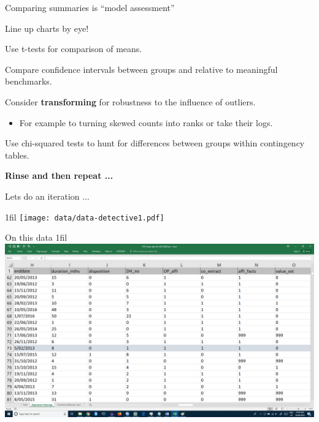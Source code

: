\documentclass{beamer}
\makeatletter
\newcommand*{\centerfloat}{%
	\parindent \z@
	\leftskip \z@ \@plus 1fil \@minus \textwidth
	\rightskip\leftskip
	\parfillskip \z@skip}
\theoremstyle{example}
\newenvironment{bigitemize}{\itemize\addtolength{\itemsep}{1em}}{\enditemize}
\makeatother
\begin{document}
	
	
	
	
	\begin{frame}{Comparing summaries is ``model assessment''}
		\begin{bigitemize}
			\item<+-> Line up charts by eye!
			\item<+-> Use t-tests for comparison of means.
			\item<+-> Compare confidence intervals between groups and relative to meaningful benchmarks.
			\item<+-> Consider \textbf{transforming} for robustness to the influence of outliers.
			\begin{itemize}
				\item For example to turning skewed counts into ranks or take their logs.
			\end{itemize}
			\item<+-> Use chi-squared tests to hunt for differences between groups within contingency tables.
		\end{bigitemize}
		
		\onslide<+->
		\textbf{Rinse and then repeat ...}
		
	\end{frame}
	
	
	\begin{frame}{Lets do an iteration ... }
		
		\centerfloat \centering	
		\texttt{[image: data/data-detective1.pdf]}
		
	\end{frame}
	
	\begin{frame}{On this data}
		\centerfloat \centering	
		\includegraphics[width=.95\textwidth]{data/data_example_a.png}
		
	\end{frame}
	
\end{document}
